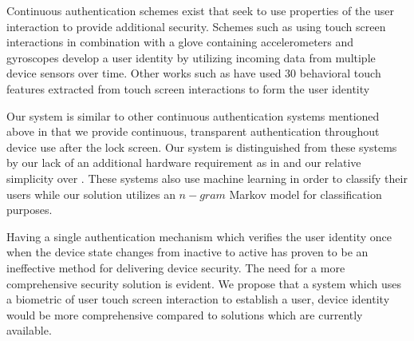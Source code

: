 %
Continuous authentication schemes exist
that seek to use 
properties of the user interaction
to provide additional security.
%
Schemes such as 
\cite{feng2012continuous}
using touch screen interactions in combination with a 
glove containing accelerometers and gyroscopes
develop a user identity
by utilizing incoming data from multiple device sensors over time.
%
Other works such as \cite{frank2013touchalytics}
have used $30$ behavioral touch features extracted from touch screen interactions
to form the user identity
%

Our system is similar to other continuous authentication
systems mentioned above
in that we provide continuous, transparent authentication 
throughout device use 
after the lock screen.
%
Our system is distinguished from these systems
by our lack of an additional hardware requirement as in \cite{feng2012continuous}
and our relative simplicity over \cite{frank2013touchalytics}.
%
These systems also use machine learning in order to classify their users
while
our solution utilizes 
an $n-gram$ Markov model for classification purposes.
%

Having a single authentication mechanism which
verifies the user identity once when the device
state changes from inactive to active has
proven to be an ineffective method for 
delivering device security.
%
The need for a more comprehensive security solution is evident.
%
We propose that a system which uses
a biometric of user touch screen interaction to
establish a user, device identity would 
be more comprehensive compared to solutions 
which are currently available.


